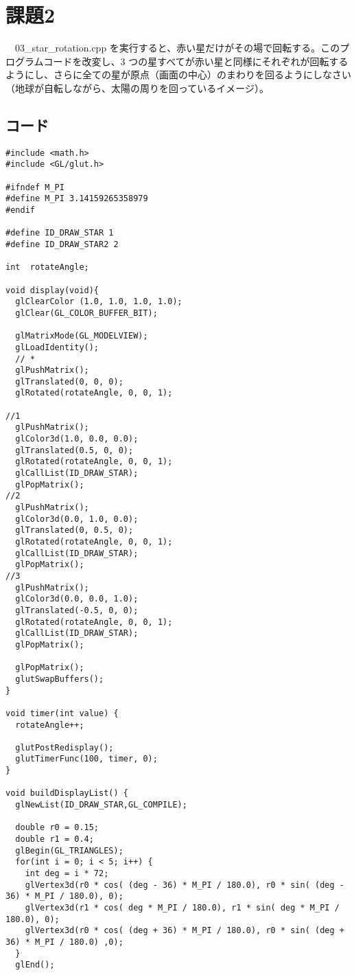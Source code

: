 \documentclass{scrartcl}
\begin{document}
\section{課題2}
\label{sec:org355b67c}
　03\_star\_rotation.cpp を実行すると、赤い星だけがその場で回転する。このプログラムコードを改変し、3 つの星すべてが赤い星と同様にそれぞれが回転するようにし、さらに全ての星が原点（画面の中心）のまわりを回るようにしなさい（地球が自転しながら、太陽の周りを回っているイメージ）。\\


\subsection{コード}
\label{sec:org40e9335}
\begin{verbatim}
#include <math.h>
#include <GL/glut.h>

#ifndef M_PI
#define M_PI 3.14159265358979
#endif

#define ID_DRAW_STAR 1
#define ID_DRAW_STAR2 2

int  rotateAngle;

void display(void){
  glClearColor (1.0, 1.0, 1.0, 1.0);
  glClear(GL_COLOR_BUFFER_BIT);

  glMatrixMode(GL_MODELVIEW);
  glLoadIdentity();
  // *
  glPushMatrix();
  glTranslated(0, 0, 0);
  glRotated(rotateAngle, 0, 0, 1);

//1
  glPushMatrix();
  glColor3d(1.0, 0.0, 0.0);
  glTranslated(0.5, 0, 0);
  glRotated(rotateAngle, 0, 0, 1);
  glCallList(ID_DRAW_STAR);
  glPopMatrix();
//2
  glPushMatrix();
  glColor3d(0.0, 1.0, 0.0);
  glTranslated(0, 0.5, 0);
  glRotated(rotateAngle, 0, 0, 1);
  glCallList(ID_DRAW_STAR);
  glPopMatrix();
//3
  glPushMatrix();
  glColor3d(0.0, 0.0, 1.0);
  glTranslated(-0.5, 0, 0);
  glRotated(rotateAngle, 0, 0, 1);
  glCallList(ID_DRAW_STAR);
  glPopMatrix();

  glPopMatrix();
  glutSwapBuffers();
}

void timer(int value) {
  rotateAngle++;

  glutPostRedisplay();
  glutTimerFunc(100, timer, 0);
}

void buildDisplayList() {
  glNewList(ID_DRAW_STAR,GL_COMPILE);

  double r0 = 0.15;
  double r1 = 0.4;
  glBegin(GL_TRIANGLES);
  for(int i = 0; i < 5; i++) {
    int deg = i * 72;
    glVertex3d(r0 * cos( (deg - 36) * M_PI / 180.0), r0 * sin( (deg - 36) * M_PI / 180.0), 0);
    glVertex3d(r1 * cos( deg * M_PI / 180.0), r1 * sin( deg * M_PI / 180.0), 0);
    glVertex3d(r0 * cos( (deg + 36) * M_PI / 180.0), r0 * sin( (deg + 36) * M_PI / 180.0) ,0);
  }
  glEnd();


\end{verbatim}
\end{document}
